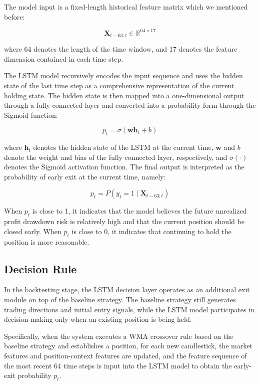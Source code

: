 \documentclass[12pt]{article}
\begin{document}
The model input is a fixed-length historical feature matrix which we mentioned before:

\begin{equation}
    \mathbf{X}_{t-63:t} \in \mathbb{R}^{64 \times 17}
\end{equation}

where 64 denotes the length of the time window, and 17 denotes the feature dimension contained 
in each time step.

The LSTM model recursively encodes the input sequence and uses the hidden state of the last 
time step as a comprehensive representation of the current holding state. The hidden state is 
then mapped into a one-dimensional output through a fully connected layer and converted into a 
probability form through the Sigmoid function:

\begin{equation}
    p_t = \sigma(\mathbf{w}\mathbf{h}_t + b)
\end{equation}

where $\mathbf{h}_t$ denotes the hidden state of the LSTM at the current time, $\mathbf{w}$ and 
$b$ denote the weight and bias of the fully connected layer, respectively, and $\sigma(\cdot)$ 
denotes the Sigmoid activation function. The final output is interpreted as the probability of 
early exit at the current time, namely:

\begin{equation}
    p_t = P(y_t = 1 \mid \mathbf{X}_{t-63:t})
\end{equation}

When $p_t$ is close to 1, it indicates that the model believes the future unrealized profit 
drawdown risk is relatively high and that the current position should be closed early. When 
$p_t$ is close to 0, it indicates that continuing to hold the position is more reasonable.

\subsection{Decision Rule}

In the backtesting stage, the LSTM decision layer operates as an additional exit module on top 
of the baseline strategy. The baseline strategy still generates trading directions and initial 
entry signals, while the LSTM model participates in decision-making only when an existing 
position is being held.

Specifically, when the system executes a WMA crossover rule based on the baseline strategy and 
establishes a position, for each new candlestick, the market features and position-context 
features are updated, and the feature sequence of the most recent 64 time steps is input into 
the LSTM model to obtain the early-exit probability $p_t$.
\end{document}

